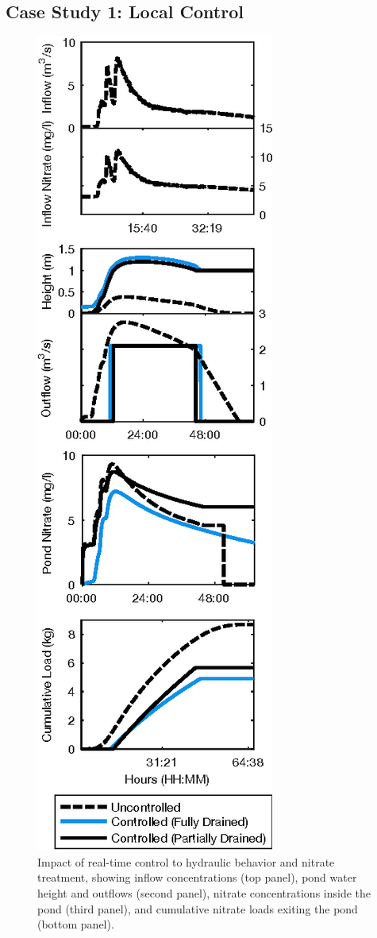 
\subsection{Case Study 1: Local Control}

\begin{figure}
\centering
  \includegraphics{gfx/Chapter-1/local.eps}
  \caption{Impact of real-time control to hydraulic behavior and nitrate treatment, showing inflow concentrations (top panel), pond water height and outflows (second panel), nitrate concentrations inside the pond (third panel), and cumulative nitrate loads exiting the pond (bottom panel).}
\label{fgr:local_control}
\end{figure}

